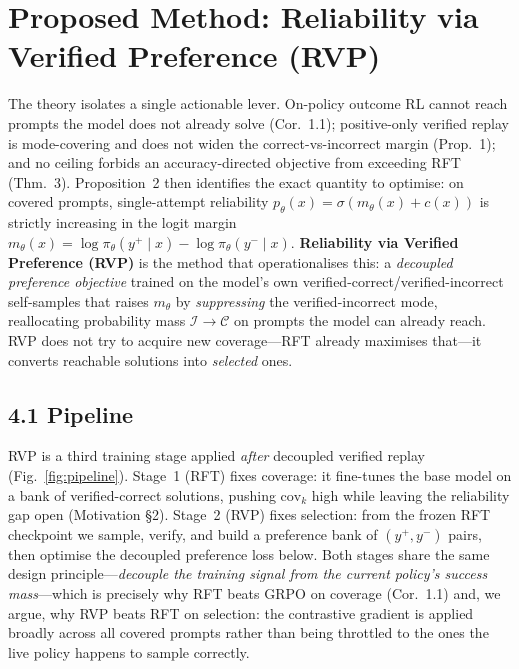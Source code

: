 \section*{Proposed Method: Reliability via Verified Preference (RVP)}

The theory isolates a single actionable lever. On-policy outcome RL cannot reach
prompts the model does not already solve (Cor.~1.1); positive-only verified replay
is mode-covering and does not widen the correct-vs-incorrect margin (Prop.~1); and
no ceiling forbids an accuracy-directed objective from exceeding RFT (Thm.~3).
Proposition~2 then identifies the exact quantity to optimise: on covered prompts,
single-attempt reliability $p_\theta(x)=\sigma(m_\theta(x)+c(x))$ is strictly
increasing in the logit margin $m_\theta(x)=\log\pi_\theta(y^{+}\!\mid x)-
\log\pi_\theta(y^{-}\!\mid x)$. \textbf{Reliability via Verified Preference (RVP)}
is the method that operationalises this: a \emph{decoupled preference objective}
trained on the model's own verified-correct/verified-incorrect self-samples that
raises $m_\theta$ by \emph{suppressing} the verified-incorrect mode, reallocating
probability mass $\mathcal{I}\!\to\!\mathcal{C}$ on prompts the model can already
reach. RVP does not try to acquire new coverage---RFT already maximises that---it
converts reachable solutions into \emph{selected} ones.

\subsection*{4.1 Pipeline}

RVP is a third training stage applied \emph{after} decoupled verified replay
(Fig.~\ref{fig:pipeline}). Stage~1 (RFT) fixes coverage: it fine-tunes the base
model on a bank of verified-correct solutions, pushing $\mathrm{cov}_k$ high while
leaving the reliability gap open (Motivation \S2). Stage~2 (RVP) fixes selection:
from the frozen RFT checkpoint we sample, verify, and build a preference bank of
$(y^{+},y^{-})$ pairs, then optimise the decoupled preference loss below. Both
stages share the same design principle---\emph{decouple the training signal from
the current policy's success mass}---which is precisely why RFT beats GRPO on
coverage (Cor.~1.1) and, we argue, why RVP beats RFT on selection: the contrastive
gradient is applied broadly across all covered prompts rather than being throttled
to the ones the live policy happens to sample correctly.

